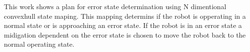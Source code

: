 This work shows a plan for error state determination using N dimentional convexhull state maping.  This mapping determins if the robot is opperating in a normal state or is approaching an error state.  If the robot is in an error state a midigation dependent on the error state is chosen to move the robot back to the normal operating state.